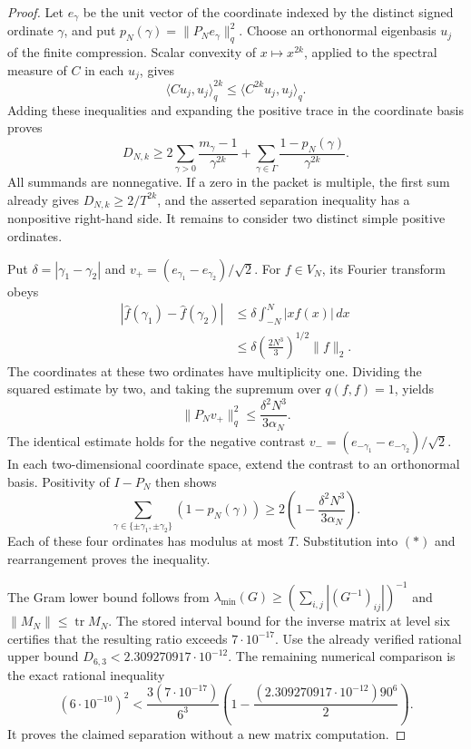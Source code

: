\begin{proof}
Let \(e_\gamma\) be the unit vector of the coordinate indexed by
the distinct signed ordinate \(\gamma\), and put
\(p_N(\gamma)=\|P_Ne_\gamma\|_q^2\).
Choose an orthonormal eigenbasis \(u_j\) of the finite compression.
Scalar convexity of \(x\mapsto x^{2k}\), applied to the spectral
measure of \(C\) in each \(u_j\), gives
\[
 \langle Cu_j,u_j\rangle_q^{2k}
       \le\langle C^{2k}u_j,u_j\rangle_q.
\]
Adding these inequalities and expanding the positive trace in the
coordinate basis proves
\[
 D_{N,k}\ge
 2\sum_{\gamma>0}\frac{m_\gamma-1}{\gamma^{2k}}
 +\sum_{\gamma\in\Gamma}
             \frac{1-p_N(\gamma)}{\gamma^{2k}}.
 \tag{*}
\]
All summands are nonnegative. If a zero in the packet is multiple,
the first sum already gives \(D_{N,k}\ge2/T^{2k}\), and the
asserted separation inequality has a nonpositive right-hand side.
It remains to consider two distinct simple positive ordinates.

Put \(\delta=|\gamma_1-\gamma_2|\) and
\(v_+=(e_{\gamma_1}-e_{\gamma_2})/\sqrt2\).
For \(f\in V_N\), its Fourier transform obeys
\[
 \begin{split}
 |\widehat f(\gamma_1)-\widehat f(\gamma_2)|
 &\le\delta\int_{-N}^N|x f(x)|\,dx\\
 &\le\delta\left(\frac{2N^3}3\right)^{1/2}\|f\|_2.
 \end{split}
\]
The coordinates at these two ordinates have multiplicity one.
Dividing the squared estimate by two, and taking the supremum over
\(q(f,f)=1\), yields
\[
 \|P_Nv_+\|_q^2\le\frac{\delta^2N^3}{3\alpha_N}.
\]
The identical estimate holds for the negative contrast
\(v_-=(e_{-\gamma_1}-e_{-\gamma_2})/\sqrt2\).
In each two-dimensional coordinate space, extend the contrast
to an orthonormal basis. Positivity of \(I-P_N\) then shows
\[
 \sum_{\gamma\in\{\pm\gamma_1,\pm\gamma_2\}}
      (1-p_N(\gamma))
 \ge2\left(1-\frac{\delta^2N^3}{3\alpha_N}\right).
\]
Each of these four ordinates has modulus at most \(T\).
Substitution into \((*)\) and rearrangement proves the inequality.

The Gram lower bound follows from
\(\lambda_{\min}(G)\ge(\sum_{i,j}|(G^{-1})_{ij}|)^{-1}\)
and \(\|M_N\|\le\operatorname{tr}M_N\).
The stored interval bound for the inverse matrix at level six
certifies that the resulting ratio exceeds \(7\cdot10^{-17}\).
Use the already verified rational upper bound
\(D_{6,3}<2.309270917\cdot10^{-12}\).
The remaining numerical comparison is the exact rational inequality
\[
 (6\cdot10^{-10})^2<
 \frac{3(7\cdot10^{-17})}{6^3}
 \left(1-\frac{(2.309270917\cdot10^{-12})90^6}{2}\right).
\]
It proves the claimed separation without a new matrix computation.


\end{proof}
